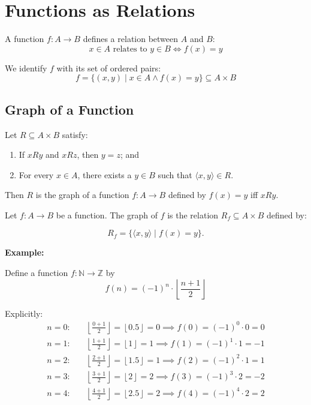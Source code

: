 \documentclass[12pt,a4paper,openany]{article}
\begin{document}
\section{Functions as Relations}

A function $f: A \to B$ defines a relation between $A$ and $B$:
\[
x \in A \text{ relates to } y \in B \iff f(x) = y
\]

We identify $f$ with its set of ordered pairs:
\[
f = \{(x, y) \mid x \in A \land f(x) = y\} \subseteq A \times B
\]

\subsection{Graph of a Function}

Let $R \subseteq A \times B$ satisfy:

\begin{enumerate}
\item If $xRy$ and $xRz$, then $y = z$; and
\item For every $x \in A$, there exists a $y \in B$ such that $\langle x, y \rangle \in R$.
\end{enumerate}

Then $R$ is the graph of a function $f : A \to B$ defined by $f(x) = y$ iff $xRy$.

Let $f : A \to B$ be a function. The graph of $f$ is the relation $R_f \subseteq A \times B$ defined by:

\[
R_f = \{ \langle x, y \rangle \mid f(x) = y \}.
\]

\textbf{Example:}

Define a function $f : \mathbb{N} \to \mathbb{Z}$ by
\[
f(n) = (-1)^n \cdot \left\lfloor \frac{n+1}{2} \right\rfloor
\]

Explicitly:
\[
\begin{aligned}
n = 0: & \quad \left\lfloor \frac{0+1}{2} \right\rfloor = \left\lfloor 0.5 \right\rfloor = 0 \implies f(0) = (-1)^0 \cdot 0 = 0 \\
n = 1: & \quad \left\lfloor \frac{1+1}{2} \right\rfloor = \left\lfloor 1 \right\rfloor = 1 \implies f(1) = (-1)^1 \cdot 1 = -1 \\
n = 2: & \quad \left\lfloor \frac{2+1}{2} \right\rfloor = \left\lfloor 1.5 \right\rfloor = 1 \implies f(2) = (-1)^2 \cdot 1 = 1 \\
n = 3: & \quad \left\lfloor \frac{3+1}{2} \right\rfloor = \left\lfloor 2 \right\rfloor = 2 \implies f(3) = (-1)^3 \cdot 2 = -2 \\
n = 4: & \quad \left\lfloor \frac{4+1}{2} \right\rfloor = \left\lfloor 2.5 \right\rfloor = 2 \implies f(4) = (-1)^4 \cdot 2 = 2
\end{aligned}
\]
\end{document}
